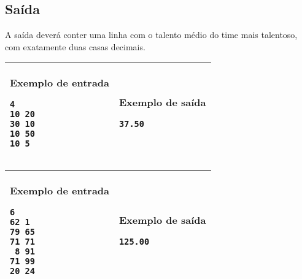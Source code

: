 \subsection*{Saída}

A saída deverá conter uma linha com o talento médio do time mais talentoso, com
exatamente duas casas decimais.

\newpage
\begin{table}[!h]
\centering
\begin{tabular}{|l|l|}
\hline
\begin{minipage}[t]{3in}
\textbf{Exemplo de entrada}
\begin{verbatim}
4
10 20
30 10
10 50
10 5
\end{verbatim}
\vspace{1mm}
\end{minipage}
&
\begin{minipage}[t]{3in}
\textbf{Exemplo de saída}
\begin{verbatim}
37.50
\end{verbatim}
\vspace{1mm}
\end{minipage} \\
\hline
\end{tabular}
\end{table}

\begin{table}[!h]
\centering
\begin{tabular}{|l|l|}
\hline
\begin{minipage}[t]{3in}
\textbf{Exemplo de entrada}
\begin{verbatim}
6
62 1
79 65
71 71
 8 91
71 99
20 24
\end{verbatim}
\vspace{1mm}
\end{minipage}
&
\begin{minipage}[t]{3in}
\textbf{Exemplo de saída}
\begin{verbatim}
125.00
\end{verbatim}
\vspace{1mm}
\end{minipage} \\
\hline
\end{tabular}
\end{table}

